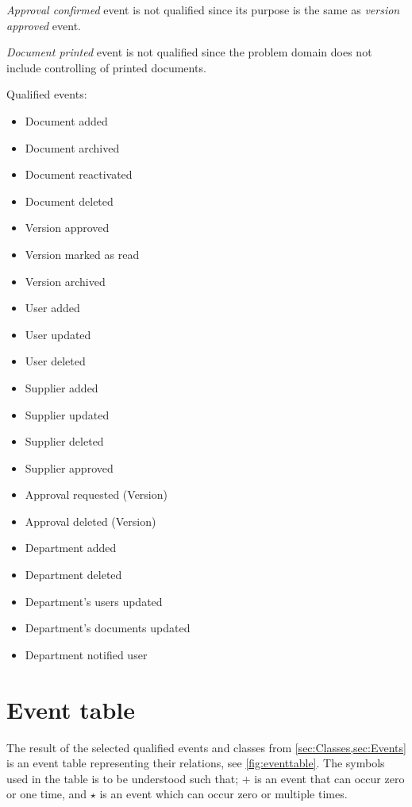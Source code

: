 \textit{Approval confirmed} event is not qualified since its purpose is the same as \textit{version approved} event.

\textit{Document printed} event is not qualified since the problem domain does not include controlling of printed documents.

Qualified events:
\begin{multicols}{2}
	\begin{itemize}
	\item Document added
	\item Document archived
	\item Document reactivated
	\item Document deleted
	\item Version approved
	\item Version marked as read
	\item Version archived
	\item User added
	\item User updated
	\item User deleted
	\item Supplier added
	\item Supplier updated
	\item Supplier deleted
	\item Supplier approved
	\item Approval requested (Version)
	\item Approval deleted (Version)
	\item Department added
	\item Department deleted
	\item Department's users updated
	\item Department's documents updated
	\item Department notified user
	\end{itemize}
\end{multicols}

\section{Event table}\label{sec:EventTable}
The result of the selected qualified events and classes from \cref{sec:Classes,sec:Events} is an event table representing their relations, see \cref{fig:eventtable}.
The symbols used in the table is to be understood such that; $+$ is an event that can occur zero or one time, and $\star$ is an event which can occur zero or multiple times.

